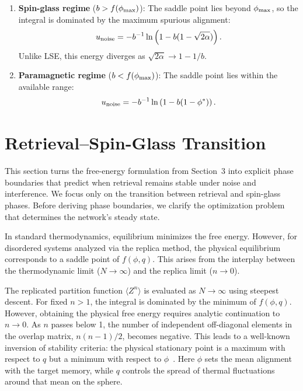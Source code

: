 \documentclass{article}
\theoremstyle{plain}
\theoremstyle{definition}
\theoremstyle{remark}
\begin{document}
\begin{enumerate}
    \item \textbf{Spin-glass regime} ($b > f(\phi_{\rm max})$): The saddle point lies beyond $\phi_{\rm max}$, so the integral is dominated by the maximum spurious alignment:
    \begin{equation}
        u_{\rm noise} = -b^{-1} \ln \left( 1 - b(1 - \sqrt{2\alpha}) \right).
    \end{equation}
    Unlike LSE, this energy diverges as $\sqrt{2\alpha} \to 1 - 1/b$.
    
    \item \textbf{Paramagnetic regime} ($b < f(\phi_{\rm max})$): The saddle point lies within the available range:
    \begin{equation}
        u_{\rm noise} = -b^{-1} \ln \left( 1 - b(1 - \phi^*) \right).
    \end{equation}
\end{enumerate}


\section{Retrieval--Spin-Glass Transition}\label{sec:transition}

This section turns the free-energy formulation from Section~3 into explicit phase boundaries that predict when retrieval remains stable under noise and interference.
We focus only on the transition between retrieval and spin-glass phases. Before deriving phase boundaries, we clarify the optimization problem that determines the network's steady state. 

In standard thermodynamics, equilibrium minimizes the free energy. However, for disordered systems analyzed via the replica method, the physical equilibrium corresponds to a saddle point of $f(\phi, q)$. This arises from the interplay between the thermodynamic limit ($N \to \infty$) and the replica limit ($n \to 0$).

The replicated partition function $\langle Z^n \rangle$ is evaluated as $N \to \infty$ using steepest descent. For fixed $n > 1$, the integral is dominated by the minimum of $f(\phi, q)$. However, obtaining the physical free energy requires analytic continuation to $n \to 0$. As $n$ passes below 1, the number of independent off-diagonal elements in the overlap matrix, $n(n-1)/2$, becomes negative. This leads to a well-known inversion of stability criteria: the physical stationary point is a maximum with respect to $q$ but a minimum with respect to $\phi$~\citep{Almeida_1978}. Here $\phi$ sets the mean alignment with the target memory, while $q$ controls the spread of thermal fluctuations around that mean on the sphere.
\end{document}
